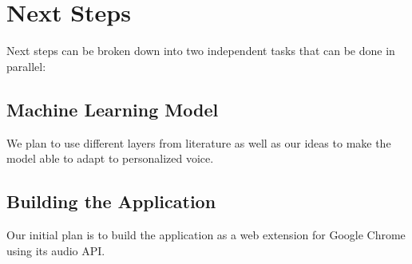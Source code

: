 \section{Next Steps}
Next steps can be broken down into two independent tasks that can be done in parallel:

\subsection{Machine Learning Model}
We plan to use different layers from literature as well as our ideas to make the model able to adapt to personalized voice.


\subsection{Building the Application}
Our initial plan is to build the application as a web extension for Google Chrome using its audio API.

